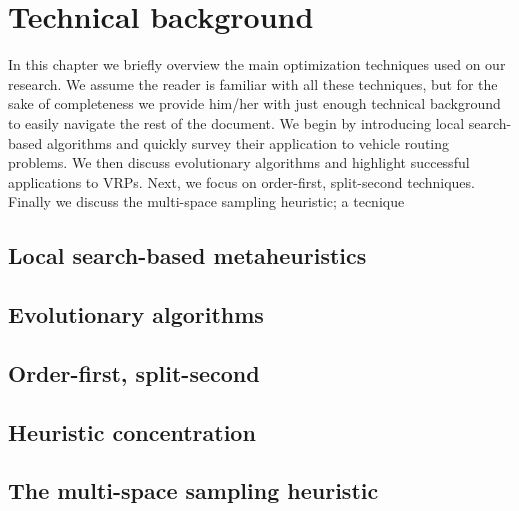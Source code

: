 \chapter{Technical background}
In this chapter we briefly overview the main optimization techniques used on our research. We assume the reader is familiar with all these techniques, but for the sake of completeness we provide him/her with just enough technical background to easily navigate the rest of the document. We begin by introducing local search-based algorithms and quickly survey their application to vehicle routing problems. We then discuss evolutionary algorithms and highlight successful applications to VRPs. Next, we focus on order-first, split-second techniques. Finally we discuss the multi-space sampling heuristic; a tecnique  


\section{Local search-based metaheuristics}

\section{Evolutionary algorithms}

\section{Order-first, split-second}

\section{Heuristic concentration}

\section{The multi-space sampling heuristic}